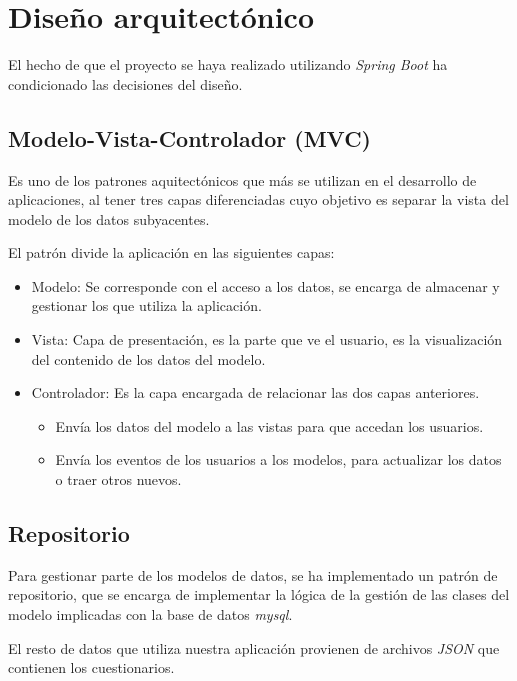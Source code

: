 \section{Diseño arquitectónico}

El hecho de que el proyecto se haya realizado utilizando \textit{Spring Boot} ha condicionado las decisiones del diseño.

\subsection{Modelo-Vista-Controlador (MVC)}

Es uno de los patrones aquitectónicos \cite{web:mvc} que más se utilizan en el desarrollo de aplicaciones, al tener tres capas diferenciadas cuyo objetivo es separar la vista del modelo de los datos subyacentes.

El patrón divide la aplicación en las siguientes capas:

\begin{itemize}
	\item Modelo: Se corresponde con el acceso a los datos, se encarga de almacenar y gestionar los que utiliza la aplicación.
	\item Vista: Capa de presentación, es la parte que ve el usuario, es la visualización del contenido de los datos del modelo.
	\item Controlador: Es la capa encargada de relacionar las dos capas anteriores. 
	\begin{itemize}
		\item Envía los datos del modelo a las vistas para que accedan los usuarios.
		\item Envía los eventos de los usuarios a los modelos, para actualizar los datos o traer otros nuevos.
	\end{itemize}
\end{itemize}


\subsection{Repositorio}

Para gestionar parte de los modelos de datos, se ha implementado un patrón de repositorio, que se encarga de implementar la lógica de la gestión de las clases del modelo implicadas con la base de datos \textit{mysql}.

El resto de datos que utiliza nuestra aplicación provienen de archivos \textit{JSON} que contienen los cuestionarios.

